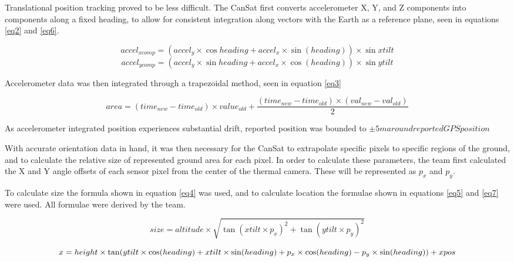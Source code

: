 \documentclass[]{report}
\begin{document}
	Translational position tracking proved to be less difficult. The CanSat first converts accelerometer X, Y, and Z components into components along a fixed heading, to allow for consistent integration along vectors with the Earth as a reference plane, seen in equations \ref{eq2} and \ref{eq6}.
	
	\begin{equation} \label{eq2}
	accel_{xcomp}=(accel_y\times\cos heading + accel_x\times\sin (heading))\times\sin xtilt 
	\end{equation}
	\begin{equation} \label{eq6}
	accel_{ycomp}=(accel_y\times\sin heading + accel_x\times\cos (heading))\times\sin ytilt
	\end{equation}
	
	Accelerometer data was then integrated through a trapezoidal method, seen in equation \ref{eq3}
	
	\begin{equation} \label{eq3}
	area=(time_{new}-time_{old})\times value_{old} + \frac{(time_{new}-time_{old})\times(val_{new}-val_{old})}{2}
	\end{equation}
	
	As accelerometer integrated position experiences substantial drift, reported position was bounded to $\pm 5m around reported GPS position$
	
	With accurate orientation data in hand, it was then necessary for the CanSat to extrapolate specific pixels to specific regions of the ground, and to calculate the relative size of represented ground area for each pixel. In order to calculate these parameters, the team first calculated the X and Y angle offsets of each sensor pixel from the center of the thermal camera. These will be represented as $p_x$ and $p_y$.
	
	To calculate size the formula shown in equation \ref{eq4} was used, and to calculate location the formulae shown in equations \ref{eq5} and \ref{eq7} were used. All formulae were derived by the team.
	
	\begin{equation} \label{eq4}
	size=altitude\times\sqrt{\tan(xtilt\times p_x)^2+\tan(ytilt\times p_y)^2}
	\end{equation}
	
	\begin{equation} \label{eq5}
	x = height\times \tan(ytilt\times\cos(heading)+xtilt\times\sin(heading)+p_x\times\cos(heading)-p_y\times\sin(heading))+xpos \\
	\end{equation}
	
\end{document}
